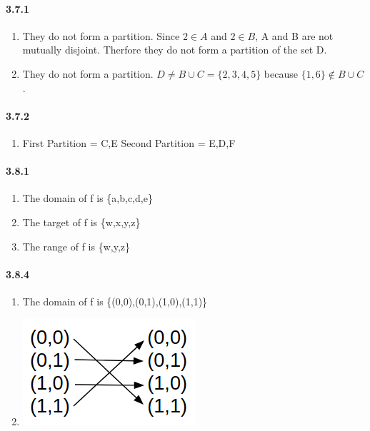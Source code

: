 \documentclass[11pt, letterpaper, twocolumn, fleqn]{article}
\begin{document}
    \paragraph{3.7.1}
    \renewcommand{\labelenumi}{\alph{enumi}.}
    \begin{enumerate}
        \item They do not form a partition. Since $2 \in A$ and $2 \in B$, A and B are not mutually disjoint. Therfore they do not form a partition of the set D.
        \item They do not form a partition. $D \neq B \cup C = \{2,3,4,5\}$ because $\{1, 6\} \notin B \cup C$. 
    \end{enumerate}
    
    \paragraph{3.7.2}
    \renewcommand{\labelenumi}{\alph{enumi}.}
    \begin{enumerate}
        \item 
            First Partition = C,E \newline
            Second Partition = E,D,F
    \end{enumerate}
    
    \paragraph{3.8.1}
    \renewcommand{\labelenumi}{\alph{enumi}.}
    \begin{enumerate}
        \item The domain of f is \{a,b,c,d,e\}
        \item The target of f is \{w,x,y,z\}
        \item The range of f is \{w,y,z\}
    \end{enumerate}
    
    \paragraph{3.8.4}
    \renewcommand{\labelenumi}{\alph{enumi}.}
    \begin{enumerate}
        \item The domain of f is \{(0,0),(0,1),(1,0),(1,1)\}
        \item \includegraphics[scale=.5]{384b}
    \end{enumerate}
    
\end{document}
